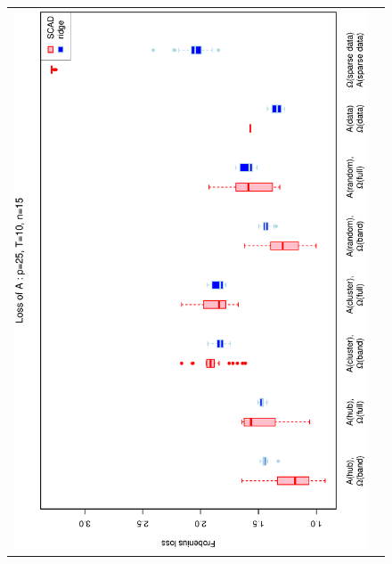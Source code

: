 \documentclass[a4paper]{article}
\begin{document}
\begin{figure}[h!]
\centering
\begin{tabular}{cc}
\includegraphics[scale=0.5,angle=270]{LossA25T10N15.eps}\\

\end{tabular}
\end{figure}
\end{document}
